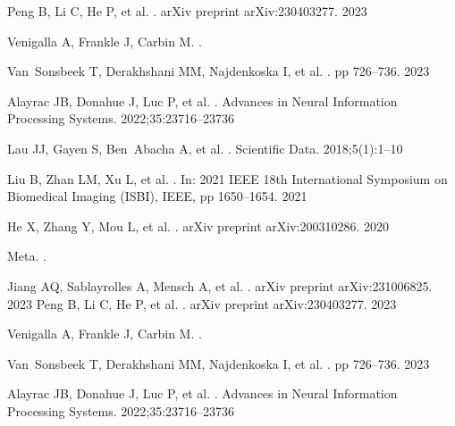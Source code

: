 \documentclass[10pt,letterpaper]{article}
\begin{document}
\begin{thebibliography}{10}
Peng B, Li C, He P, et al.
.
\newblock arXiv preprint arXiv:230403277. 2023

Venigalla A, Frankle J, Carbin M.
.

Van~Sonsbeek T, Derakhshani MM, Najdenkoska I, et al.
.
\newblock pp 726--736. 2023

Alayrac JB, Donahue J, Luc P, et al.
.
\newblock Advances in Neural Information Processing Systems. 2022;35:23716--23736

Lau JJ, Gayen S, Ben~Abacha A, et al.
.
\newblock Scientific Data. 2018;5(1):1--10

Liu B, Zhan LM, Xu L, et al.
.
\newblock In: 2021 IEEE 18th International Symposium on Biomedical Imaging (ISBI), IEEE, pp 1650--1654. 2021

He X, Zhang Y, Mou L, et al.
.
\newblock arXiv preprint arXiv:200310286. 2020

Meta.
.

Jiang AQ, Sablayrolles A, Mensch A, et al.
.
\newblock arXiv preprint arXiv:231006825. 2023
Peng B, Li C, He P, et al.
.
\newblock arXiv preprint arXiv:230403277. 2023

Venigalla A, Frankle J, Carbin M.
.

Van~Sonsbeek T, Derakhshani MM, Najdenkoska I, et al.
.
\newblock pp 726--736. 2023

Alayrac JB, Donahue J, Luc P, et al.
.
\newblock Advances in Neural Information Processing Systems. 2022;35:23716--23736


\end{thebibliography}
\end{document}
